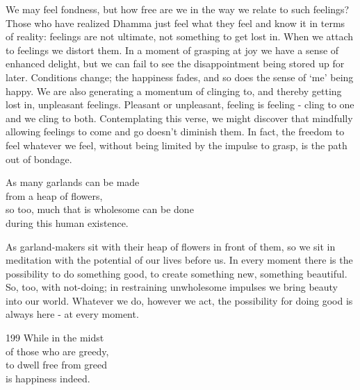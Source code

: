 \begin{dhpRefl}
We may feel fondness, but how free are we in the way we relate to such feelings? Those who have realized Dhamma just feel what they feel and know it in terms of reality: feelings are not ultimate, not something to get lost in. When we attach to feelings we distort them. In a moment of grasping at joy we have a sense of enhanced delight, but we can fail to see the disappointment being stored up for later. Conditions change; the happiness fades, and so does the sense of `me' being happy. We are also generating a momentum of clinging to, and thereby getting lost in, unpleasant feelings. Pleasant or unpleasant, feeling is feeling - cling to one and we cling to both. Contemplating this verse, we might discover that mindfully allowing feelings to come and go doesn't diminish them. In fact, the freedom to feel whatever we feel, without being limited by the impulse to grasp, is the path out of bondage.
\end{dhpRefl}


\begin{dhpVerse}{53}
\label{dhp-53}
As many garlands can be made\\
from a heap of flowers,\\
so too, much that is wholesome can be done\\
during this human existence.
\end{dhpVerse}

\begin{dhpRefl}
As garland-makers sit with their heap of flowers in front of them, so we sit in meditation with the potential of our lives before us. In every moment there is the possibility to do something good, to create something new, something beautiful. So, too, with not-doing; in restraining unwholesome impulses we bring beauty into our world. Whatever we do, however we act, the possibility for doing good is always here - at every moment.
\end{dhpRefl}


\begin{dhpVerse}{199}
\label{dhp-199}
While in the midst\\
of those who are greedy,\\
to dwell free from greed\\
is happiness indeed.
\end{dhpVerse}

